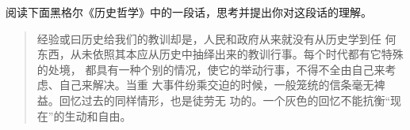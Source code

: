 \documentclass[a4paper, zihao = 5, unicodeGBMath, %
]{ctexart}
\begin{document}

\begin{qus}

\item 阅读下面黑格尔《历史哲学》中的一段话，思考并提出你对这段话的理解。

  \begin{quotation}
    \kaishu 经验或曰历史给我们的教训却是，人民和政府从来就没有从历史学到任
    何东西，从未依照其本应从历史中抽绎出来的教训行事。每个时代都有它特殊的处境，
    都具有一种个别的情况，使它的举动行事，不得不全由自己来考虑、自己来解决。当重
    大事件纷乘交迫的时候，一般笼统的信条毫无裨益。回忆过去的同样情形，也是徒劳无
    功的。一个灰色的回忆不能抗衡``现在''的生动和自由。
  \end{quotation}


\end{qus}
\end{document}
